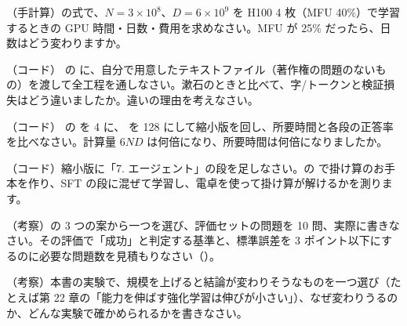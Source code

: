 \begin{exercises}
\item （手計算）の式で、$N=3\times10^{8}$、$D=6\times10^{9}$ を H100 4 枚（MFU 40\%）で学習するときの GPU 時間・日数・費用を求めなさい。MFU が 25\% だったら、日数はどう変わりますか。
\item （コード） の  に、自分で用意したテキストファイル（著作権の問題のないもの）を渡して全工程を通しなさい。漱石のときと比べて、字/トークンと検証損失はどう違いましたか。違いの理由を考えなさい。
\item （コード） の  を 4 に、 を 128 にして縮小版を回し、所要時間と各段の正答率を比べなさい。計算量 $6ND$ は何倍になり、所要時間は何倍になりましたか。
\item （コード）縮小版に「7. エージェント」の段を足しなさい。の  で掛け算のお手本を作り、SFT の段に混ぜて学習し、電卓を使って掛け算が解けるかを測ります。
\item （考察）の 3 つの案から一つを選び、評価セットの問題を 10 問、実際に書きなさい。その評価で「成功」と判定する基準と、標準誤差を 3 ポイント以下にするのに必要な問題数を見積もりなさい（）。
\item （考察）本書の実験で、規模を上げると結論が変わりそうなものを一つ選び（たとえば第 22 章の「能力を伸ばす強化学習は伸びが小さい」）、なぜ変わりうるのか、どんな実験で確かめられるかを書きなさい。
\end{exercises}
